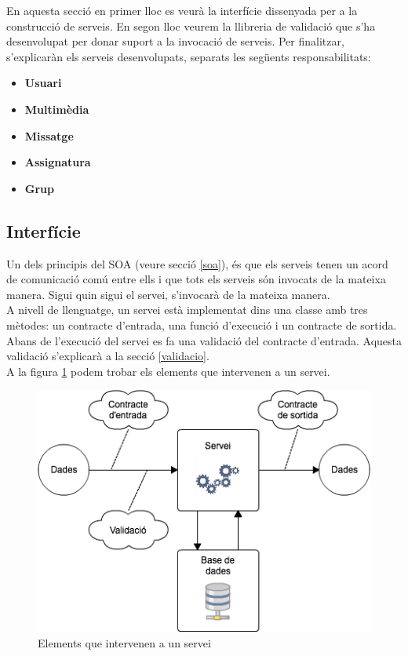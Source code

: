 	En aquesta secció en primer lloc es veurà la interfície dissenyada per a la construcció de serveis. En segon lloc veurem la llibreria de validació que s'ha desenvolupat per donar suport a la invocació de serveis. Per finalitzar, s'explicaràn els serveis desenvolupats, separats les següents responsabilitats:
	
	\begin{itemize}
		\item \textbf{Usuari}
		\item \textbf{Multimèdia}
		\item \textbf{Missatge}
		\item \textbf{Assignatura}
		\item \textbf{Grup}
	\end{itemize}
	
	\subsection{Interfície}
	
	Un dels principis del \ac{SOA} (veure secció \ref{soa}), és que els serveis tenen un acord de comunicació comú entre ells i que tots els serveis són invocats de la mateixa manera. Sigui quin sigui el servei, s'invocarà de la mateixa manera.\\
	
	A nivell de llenguatge, un servei està implementat dins una classe amb tres mètodes: un contracte d'entrada, una funció d'execució i un contracte de sortida. Abans de l'execució del servei es fa una validació del contracte d'entrada. Aquesta validació s'explicarà a la secció \ref{validacio}.\\
	
	 A la figura \ref{fig:servei} podem trobar els elements que intervenen a un servei.\\
	
	\begin{figure}[h!]
		\includegraphics[scale=0.5]{img/servei.png}
   		\centering
    	\caption{Elements que intervenen a un servei}
   	 	\label{fig:servei}
	\end{figure}
	
